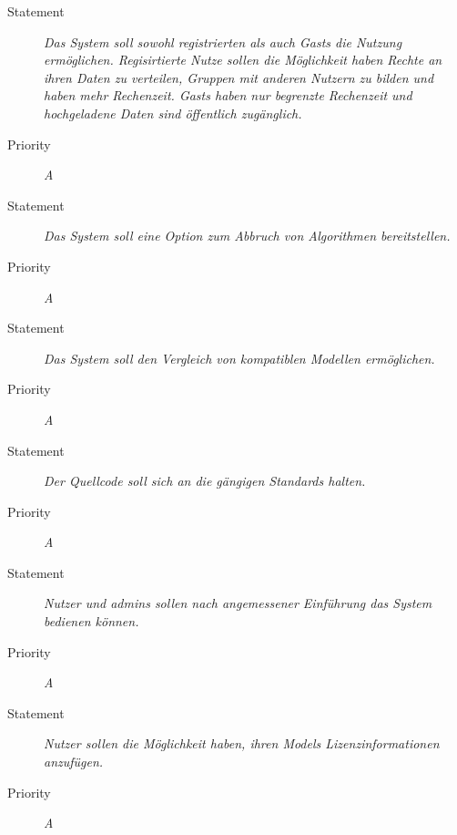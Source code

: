 
\UR
\begin{description}
	\item[Statement] \textit{Das System soll sowohl registrierten als auch \glspl{Gast} die Nutzung ermöglichen. Regisirtierte Nutze sollen die Möglichkeit haben Rechte an ihren Daten zu verteilen, Gruppen mit anderen Nutzern zu bilden und haben mehr Rechenzeit. \glspl{Gast} haben nur begrenzte Rechenzeit und hochgeladene Daten sind öffentlich zugänglich.}
	\item[Priority] \textit{A}
\end{description}


\UR
\begin{description}
	\item[Statement] \textit{Das System soll eine Option zum Abbruch von Algorithmen bereitstellen.}
	\item[Priority] \textit{A}
\end{description}


\UR
\begin{description}
	\item[Statement] \textit{Das System soll den Vergleich von kompatiblen Modellen ermöglichen.}
	\item[Priority] \textit{A}
\end{description}


\UR
\begin{description}
	\item[Statement] \textit{Der Quellcode soll sich an die gängigen Standards halten.}
	\item[Priority] \textit{A}
\end{description}

\UR
\begin{description}
	\item[Statement] \textit{Nutzer und \glspl{admin} sollen nach angemessener Einführung das System bedienen können.}
	\item[Priority] \textit{A}
\end{description}


\UR
\begin{description}
	\item[Statement] \textit{Nutzer sollen die Möglichkeit haben, ihren \glspl{Model} Lizenzinformationen anzufügen.}
	\item[Priority] \textit{A}
\end{description}


